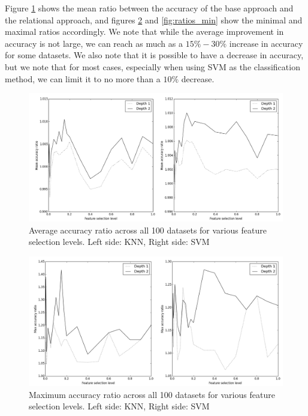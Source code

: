 \documentclass{article}
\theoremstyle{definition}
\begin{document}
Figure \ref{fig:ratios} shows the mean ratio between the accuracy of the base approach and the relational approach, and figures \ref{fig:ratios_max} and \ref{fig:ratios_min} show the minimal and maximal ratios accordingly. We note that while the average improvement in accuracy is not large, we can reach as much as a $15\%-30\%$ increase in accuracy for some datasets. We also note that it is possible to have a decrease in accuracy, but we note that for most cases, especially when using SVM as the classification method, we can limit it to no more than a $10\%$ decrease.

\begin{figure}[H]
	\centering
	\includegraphics[width=\linewidth]{ratios.png}
	\caption{Average accuracy ratio across all 100 datasets for various feature selection levels. Left side: KNN, Right side: SVM}
	\label{fig:ratios}
\end{figure}

\begin{figure}[H]
	\centering
	\includegraphics[width=\linewidth]{ratios_max.png}
	\caption{Maximum accuracy ratio across all 100 datasets for various feature selection levels. Left side: KNN, Right side: SVM}
	\label{fig:ratios_max}
\end{figure}
\end{document}
